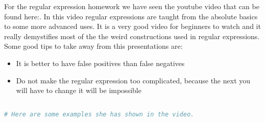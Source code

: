 For the regular expression homework we have seen the youtube video that can be found here:. In this video regular expressions are taught from the absolute basics to some more advanced uses. It is a very good video for beginners to watch and it really demystifies most of the the weird constructions used in regular expressions. Some good tips to take away from this presentations are:
\begin{itemize}
\item It is better to have false positives than false negatives
\item Do not make the regular expression too complicated, because the next you will have to change it will be impossible
\end{itemize}
\begin{lstlisting}[language=bash,label=lst:exampleregex,caption=Regex examples]

# Here are some examples she has shown in the video.

\end{lstlisting}